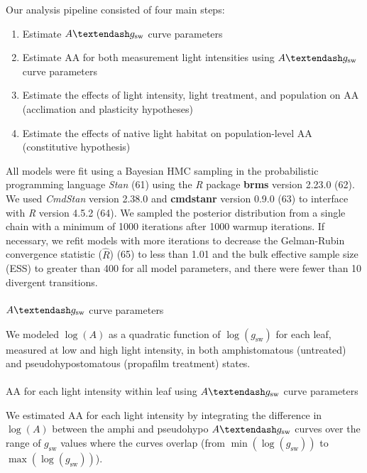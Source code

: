\documentclass[
  letterpaper,
  DIV=11,
  numbers=noendperiod]{scrartcl}
\makeatletter
\let\oldparagraph\paragraph
\renewcommand{\paragraph}{
    \@ifstar
      \xxxParagraphStar
      \xxxParagraphNoStar
  }
\newcommand{\xxxParagraphStar}[1]{\oldparagraph*{#1}\mbox{}}
\newcommand{\xxxParagraphNoStar}[1]{\oldparagraph{#1}\mbox{}}
\providecommand{\tightlist}{%
  \setlength{\itemsep}{0pt}\setlength{\parskip}{0pt}}
\newcommand{\aax}{$\mathrm{AA}$}
\newcommand{\agcurve}{$A \textendash g_\text{sw}$}
\newcommand{\gsw}{$g_\text{sw}$}
\newcommand{\loggsw}{$\log(g_\text{sw})$}
\newcommand{\logA}{$\log(A)$}
\makeatother
\begin{document}
Our analysis pipeline consisted of four main steps:

\begin{enumerate}
\def\labelenumi{\arabic{enumi}.}
\tightlist
\item
  Estimate \agcurve{} curve parameters
\item
  Estimate \aax{} for both measurement light intensities using
  \agcurve{} curve parameters
\item
  Estimate the effects of light intensity, light treatment, and
  population on \aax{} (acclimation and plasticity hypotheses)
\item
  Estimate the effects of native light habitat on population-level
  \aax{} (constitutive hypothesis)
\end{enumerate}

All models were fit using a Bayesian HMC sampling in the probabilistic
programming language \emph{Stan} (61) using the \emph{R} package
\textbf{brms} version 2.23.0 (62). We used \emph{CmdStan} version 2.38.0
and \textbf{cmdstanr} version 0.9.0 (63) to interface with \emph{R}
version 4.5.2 (64). We sampled the posterior distribution from a single
chain with a minimum of 1000 iterations after 1000 warmup iterations. If
necessary, we refit models with more iterations to decrease the
Gelman-Rubin convergence statistic (\(\hat{R}\)) (65) to less than 1.01
and the bulk effective sample size (ESS) to greater than 400 for all
model parameters, and there were fewer than 10 divergent transitions.

\paragraph{\texorpdfstring{\agcurve{} curve
parameters}{ curve parameters}}\label{sec-agcurve-pars}

We modeled \logA{} as a quadratic function of \loggsw{} for each leaf,
measured at low and high light intensity, in both amphistomatous
(untreated) and pseudohypostomatous (propafilm treatment) states.

\paragraph{\texorpdfstring{\aax{} for each light intensity within leaf
using \agcurve{} curve
parameters}{ for each light intensity within leaf using  curve parameters}}\label{sec-aa-est}

We estimated \aax{} for each light intensity by integrating the
difference in \logA{} between the amphi and pseudohypo \agcurve{} curves
over the range of \gsw{} values where the curves overlap (from
\(\min(\log(g_\text{sw}))\) to \(\max(\log(g_\text{sw}))\)).
\end{document}
